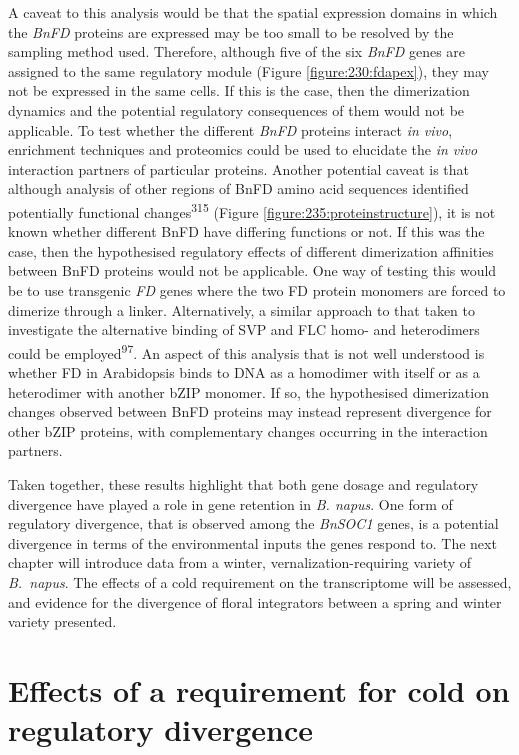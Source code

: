 \documentclass[12pt,]{book}
\begin{document}
A caveat to this analysis would be that the spatial expression domains
in which the \emph{BnFD} proteins are expressed may be too small to be
resolved by the sampling method used. Therefore, although five of the
six \emph{BnFD} genes are assigned to the same regulatory module (Figure
\ref{figure:230:fdapex}), they may not be expressed in the same cells.
If this is the case, then the dimerization dynamics and the potential
regulatory consequences of them would not be applicable. To test whether
the different \emph{BnFD} proteins interact \emph{in vivo}, enrichment
techniques and proteomics could be used to elucidate the \emph{in vivo}
interaction partners of particular proteins. Another potential caveat is
that although analysis of other regions of BnFD amino acid sequences
identified potentially functional changes\textsuperscript{315} (Figure
\ref{figure:235:proteinstructure}), it is not known whether different
BnFD have differing functions or not. If this was the case, then the
hypothesised regulatory effects of different dimerization affinities
between BnFD proteins would not be applicable. One way of testing this
would be to use transgenic \emph{FD} genes where the two FD protein
monomers are forced to dimerize through a linker. Alternatively, a
similar approach to that taken to investigate the alternative binding of
SVP and FLC homo- and heterodimers could be
employed\textsuperscript{97}. An aspect of this analysis that is not
well understood is whether FD in Arabidopsis binds to DNA as a homodimer
with itself or as a heterodimer with another bZIP monomer. If so, the
hypothesised dimerization changes observed between BnFD proteins may
instead represent divergence for other bZIP proteins, with complementary
changes occurring in the interaction partners.

Taken together, these results highlight that both gene dosage and
regulatory divergence have played a role in gene retention in \emph{B.
napus}. One form of regulatory divergence, that is observed among the
\emph{BnSOC1} genes, is a potential divergence in terms of the
environmental inputs the genes respond to. The next chapter will
introduce data from a winter, vernalization-requiring variety of
\emph{B.~napus}. The effects of a cold requirement on the transcriptome
will be assessed, and evidence for the divergence of floral integrators
between a spring and winter variety presented.

\chapter{Effects of a requirement for cold on regulatory
divergence}\label{chapter:winter}
\end{document}
